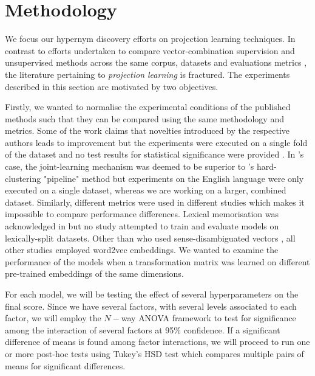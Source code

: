 \chapter{Methodology}

We focus our hypernym discovery efforts on projection learning techniques.  In contrast to efforts undertaken to compare vector-combination supervision and unsupervised methods across the same corpus, datasets and evaluations metrics \citep{shwartz2017siege, roller2014inclusive, levy2015supervised}, the literature pertaining to \textit{projection learning} is fractured.  The experiments described in this section are motivated by two objectives.  

Firstly, we wanted to normalise the experimental conditions of the published methods such that they can be compared using the same methodology and metrics.  Some of the work claims that novelties introduced by the respective authors leads to improvement but the experiments were executed on a single fold of the dataset and no test results for statistical significance were provided \citep{Fu2014, ustalov2017negative, yamane2016distributional}.  In \citep{yamane2016distributional}'s case, the joint-learning mechanism was deemed to be superior to \citep{Fu2014}'s hard-clustering "pipeline" method but experiments on the English language were only executed on a single dataset, whereas we are working on a larger, combined dataset.  Similarly, different metrics were used in different studies which makes it impossible to compare performance differences.  Lexical memorisation was acknowledged in \citep{espinosa2016supervised} but no study attempted to train and evaluate models on lexically-split datasets.  Other than \citep{espinosa2016supervised} who used sense-disambiguated vectors \citep{iacobacci2015sensembed}, all other studies employed word2vec embeddings.  We wanted to examine the performance of the models when a transformation matrix was learned on different pre-trained embeddings of the same dimensions.  

For each model, we will be testing the effect of several hyperparameters on the final score.  Since we have several factors, with several levels associated to each factor, we will employ the $N-$way \ac{ANOVA} framework to test for significance among the interaction of several factors at 95\% confidence.  If a significant difference of means is found among factor interactions, we will proceed to run one or more post-hoc tests using Tukey's \ac{HSD} test which compares multiple pairs of means for significant differences.

